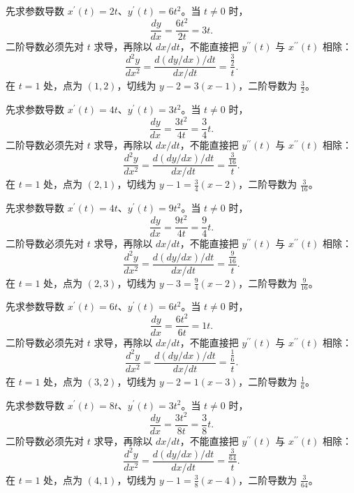 \documentclass[UTF8,12pt,a4paper,fontset=fandol]{ctexart}
\begin{document}
\begin{solve}\label{ans:c9q7}
先求参数导数 $x^{\prime}(t)=2t$、$y^{\prime}(t)=6t^2$。当 $t\ne0$ 时，
\[
\frac{dy}{dx}=\frac{6t^2}{2t}=3t.
\]
二阶导数必须先对 $t$ 求导，再除以 $dx/dt$，不能直接把 $y^{\prime\prime}(t)$ 与 $x^{\prime\prime}(t)$ 相除：
\[
\frac{d^2y}{dx^2}=\frac{d(dy/dx)/dt}{dx/dt}=\frac{\frac{3}{2}}t.
\]
在 $t=1$ 处，点为 $(1,2)$，切线为 $y-2=3(x-1)$，二阶导数为 $\frac{3}{2}$。
\end{solve}

\begin{solve}\label{ans:c9q8}
先求参数导数 $x^{\prime}(t)=4t$、$y^{\prime}(t)=3t^2$。当 $t\ne0$ 时，
\[
\frac{dy}{dx}=\frac{3t^2}{4t}=\frac{3}{4}t.
\]
二阶导数必须先对 $t$ 求导，再除以 $dx/dt$，不能直接把 $y^{\prime\prime}(t)$ 与 $x^{\prime\prime}(t)$ 相除：
\[
\frac{d^2y}{dx^2}=\frac{d(dy/dx)/dt}{dx/dt}=\frac{\frac{3}{16}}t.
\]
在 $t=1$ 处，点为 $(2,1)$，切线为 $y-1=\frac{3}{4}(x-2)$，二阶导数为 $\frac{3}{16}$。
\end{solve}

\begin{solve}\label{ans:c9q9}
先求参数导数 $x^{\prime}(t)=4t$、$y^{\prime}(t)=9t^2$。当 $t\ne0$ 时，
\[
\frac{dy}{dx}=\frac{9t^2}{4t}=\frac{9}{4}t.
\]
二阶导数必须先对 $t$ 求导，再除以 $dx/dt$，不能直接把 $y^{\prime\prime}(t)$ 与 $x^{\prime\prime}(t)$ 相除：
\[
\frac{d^2y}{dx^2}=\frac{d(dy/dx)/dt}{dx/dt}=\frac{\frac{9}{16}}t.
\]
在 $t=1$ 处，点为 $(2,3)$，切线为 $y-3=\frac{9}{4}(x-2)$，二阶导数为 $\frac{9}{16}$。
\end{solve}

\begin{solve}\label{ans:c9q10}
先求参数导数 $x^{\prime}(t)=6t$、$y^{\prime}(t)=6t^2$。当 $t\ne0$ 时，
\[
\frac{dy}{dx}=\frac{6t^2}{6t}=1t.
\]
二阶导数必须先对 $t$ 求导，再除以 $dx/dt$，不能直接把 $y^{\prime\prime}(t)$ 与 $x^{\prime\prime}(t)$ 相除：
\[
\frac{d^2y}{dx^2}=\frac{d(dy/dx)/dt}{dx/dt}=\frac{\frac{1}{6}}t.
\]
在 $t=1$ 处，点为 $(3,2)$，切线为 $y-2=1(x-3)$，二阶导数为 $\frac{1}{6}$。
\end{solve}

\begin{solve}\label{ans:c9q11}
先求参数导数 $x^{\prime}(t)=8t$、$y^{\prime}(t)=3t^2$。当 $t\ne0$ 时，
\[
\frac{dy}{dx}=\frac{3t^2}{8t}=\frac{3}{8}t.
\]
二阶导数必须先对 $t$ 求导，再除以 $dx/dt$，不能直接把 $y^{\prime\prime}(t)$ 与 $x^{\prime\prime}(t)$ 相除：
\[
\frac{d^2y}{dx^2}=\frac{d(dy/dx)/dt}{dx/dt}=\frac{\frac{3}{64}}t.
\]
在 $t=1$ 处，点为 $(4,1)$，切线为 $y-1=\frac{3}{8}(x-4)$，二阶导数为 $\frac{3}{64}$。
\end{solve}
\end{document}
